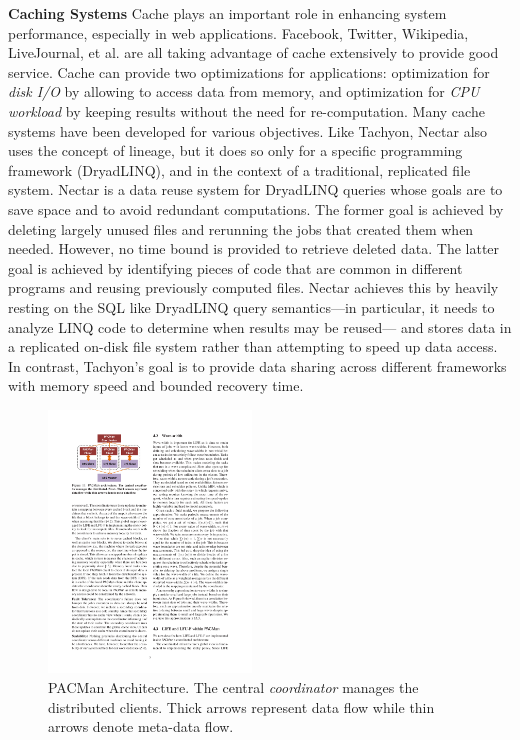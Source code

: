 \documentclass[twocolumn]{article}
\begin{document}
\noindent
\textbf{Caching Systems}
Cache plays an important role in enhancing system performance, especially in web applications. 
Facebook, Twitter, Wikipedia, LiveJournal, et al. are all taking advantage of cache extensively to provide good service. 
Cache can provide two optimizations for applications: optimization for \textit{disk I/O} by allowing to access data from
memory, and optimization for \textit{CPU workload} by keeping results without the need for re-computation. 
Many cache systems have been developed for various objectives.
Like Tachyon, Nectar also uses the concept of lineage, but it does so only for a specific programming framework (DryadLINQ), and in the context of a traditional, replicated file system. 
Nectar is a data reuse system for DryadLINQ queries whose goals are to save space and to avoid redundant computations. The former goal is achieved by deleting largely unused files and rerunning the jobs that created them when needed. However, no time bound is provided to retrieve deleted data. The latter goal is achieved by identifying pieces of code that are common in different programs and reusing previously computed files. Nectar achieves this by heavily resting on the SQL like DryadLINQ query semantics—in particular, it needs to analyze LINQ code to determine when results may be reused— and stores data in a replicated on-disk file system rather than attempting to speed up data access. In contrast, Tachyon’s goal is to provide data sharing across different frameworks with memory speed and bounded recovery time.

\begin{figure}[htb]
        \centering
        \includegraphics[width=0.48\textwidth]{pacman.pdf}
        \caption{PACMan Architecture. The central \textit{coordinator} manages the distributed clients. Thick arrows represent data flow while thin arrows denote meta-data flow.}
        \label{fig:pacman}
\end{figure} 
\end{document}
